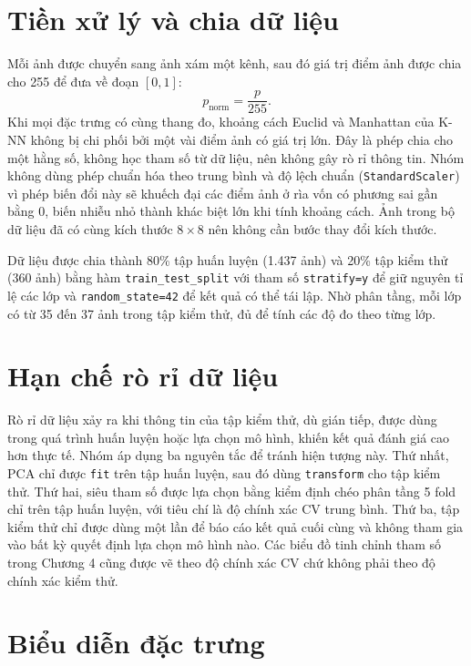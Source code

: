 \documentclass[a4paper,oneside]{report}
\begin{document}
\section{Tiền xử lý và chia dữ liệu}

Mỗi ảnh được chuyển sang ảnh xám một kênh, sau đó giá trị điểm ảnh được chia cho 255 để đưa về đoạn $[0, 1]$:
\begin{equation}
p_{\text{norm}} = \frac{p}{255}.
\end{equation}
Khi mọi đặc trưng có cùng thang đo, khoảng cách Euclid và Manhattan của K-NN không bị chi phối bởi một vài điểm
ảnh có giá trị lớn. Đây là phép chia cho một hằng số, không học tham số từ dữ liệu, nên không gây rò rỉ thông tin.
Nhóm không dùng phép chuẩn hóa theo trung bình và độ lệch chuẩn (\texttt{StandardScaler}) vì phép biến đổi này sẽ
khuếch đại các điểm ảnh ở rìa vốn có phương sai gần bằng 0, biến nhiễu nhỏ thành khác biệt lớn khi tính khoảng cách.
Ảnh trong bộ dữ liệu đã có cùng kích thước $8 \times 8$ nên không cần bước thay đổi kích thước.

Dữ liệu được chia thành 80\% tập huấn luyện (1.437 ảnh) và 20\% tập kiểm thử (360 ảnh) bằng hàm
\texttt{train\_test\_split} với tham số \texttt{stratify=y} để giữ nguyên tỉ lệ các lớp và
\texttt{random\_state=42} để kết quả có thể tái lập. Nhờ phân tầng, mỗi lớp có từ 35 đến 37 ảnh trong tập kiểm
thử, đủ để tính các độ đo theo từng lớp.

\section{Hạn chế rò rỉ dữ liệu}

Rò rỉ dữ liệu xảy ra khi thông tin của tập kiểm thử, dù gián tiếp, được dùng trong quá trình huấn luyện hoặc lựa
chọn mô hình, khiến kết quả đánh giá cao hơn thực tế. Nhóm áp dụng ba nguyên tắc để tránh hiện tượng này. Thứ nhất,
PCA chỉ được \texttt{fit} trên tập huấn luyện, sau đó dùng \texttt{transform} cho tập kiểm thử. Thứ hai, siêu tham
số được lựa chọn bằng kiểm định chéo phân tầng 5 fold chỉ trên tập huấn luyện, với tiêu chí là độ chính xác CV
trung bình. Thứ ba, tập kiểm thử chỉ được dùng một lần để báo cáo kết quả cuối cùng và không tham gia vào bất kỳ
quyết định lựa chọn mô hình nào. Các biểu đồ tinh chỉnh tham số trong Chương 4 cũng được vẽ theo độ chính xác CV
chứ không phải theo độ chính xác kiểm thử.

\section{Biểu diễn đặc trưng}
\end{document}

